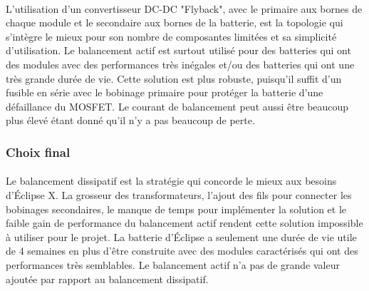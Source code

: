 \paragraph*{}
L'utilisation d'un convertisseur DC-DC "Flyback", avec le primaire aux bornes de chaque module et le secondaire aux bornes de la batterie, est la topologie qui s'intègre le mieux pour son nombre de composantes limitées et sa simplicité d'utilisation. Le balancement actif est surtout utilisé pour des batteries qui ont des modules avec des performances très inégales et/ou des batteries qui ont une très grande durée de vie. Cette solution est plus robuste, puisqu'il suffit d'un fusible en série avec le bobinage primaire pour protéger la batterie d'une défaillance du MOSFET. Le courant de balancement peut aussi être beaucoup plus élevé étant donné qu'il n'y a pas beaucoup de perte.

\subsubsection*{Choix final}
\paragraph*{}
Le balancement dissipatif est la stratégie qui concorde le mieux aux besoins d'Éclipse X. La grosseur des transformateurs, l'ajout des fils pour connecter les bobinages secondaires, le manque de temps pour implémenter la solution et le faible gain de performance du balancement actif rendent cette solution impossible à utiliser pour le projet. La batterie d'Éclipse a seulement une durée de vie utile de 4 semaines en plus d'être construite avec des modules caractérisés qui ont des performances très semblables. Le balancement actif n'a pas de grande valeur ajoutée par rapport au balancement dissipatif.



